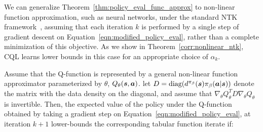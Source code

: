 We can generalize Theorem~\ref{thm:policy_eval_func_approx} to non-linear function approximation, such as neural networks, {under the standard NTK framework~\citep{ntk}}, assuming that each iteration $k$ is performed by a single step of gradient descent on Equation~\ref{eqn:modified_policy_eval}, rather than a complete minimization of this objective. As we show in Theorem~\ref{corr:nonlinear_ntk}, CQL learns lower bounds in this case for an appropriate choice of $\alpha_k$. 

\begin{theorem}
\label{corr:nonlinear_ntk}
Assume that the Q-function is represented by a general non-linear function approximator parameterized by $\theta$, $Q_\theta(\boldsymbol{s}, \boldsymbol{a})$. let $D = \text{diag}(d^{\pi_\beta}(\boldsymbol{s}) {\pi_\beta}(\boldsymbol{a}|\boldsymbol{s}))$ denote the matrix with the data density on the diagonal, and assume that $\nabla_\theta Q_\theta^T D \nabla_\theta Q_\theta$ is invertible. Then, the expected value of the policy under the Q-function obtained by taking a gradient step on Equation~\ref{eqn:modified_policy_eval}, at iteration $k+1$ lower-bounds the corresponding tabular function iterate if: 
\end{theorem}

